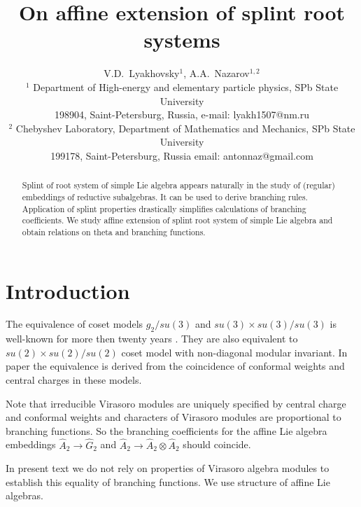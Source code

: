 \documentclass[12pt]{article}
\begin{document}
\title{On affine extension of splint root systems}



\author{V.D.~Lyakhovsky$^1$, A.A.~Nazarov$^{1,2}$ \\
  {\small $^1$ Department of High-energy and elementary particle physics, SPb State University}\\
  {\small 198904, Saint-Petersburg, Russia,}
  {\small e-mail: lyakh1507@nm.ru}\\
  {\small$^{2}$ Chebyshev Laboratory,}
  {\small Department of Mathematics and Mechanics, SPb State University}\\
  {\small 199178, Saint-Petersburg, Russia}
  {\small email: antonnaz@gmail.com}}
\date{}
\maketitle

\begin{abstract}
Splint of root system of simple Lie algebra appears naturally in
the study of (regular) embeddings of reductive subalgebras. It can
be used to derive branching rules. Application of
splint properties drastically simplifies calculations of
branching coefficients. We study affine extension of splint root system of simple Lie algebra and obtain relations on theta and branching functions.
\end{abstract}

\section{Introduction}
\label{sec:introduction}

The equivalence of coset models $g_2/su(3)$ and $su(3)\times
su(3)/su(3)$ is well-known for more then twenty years \cite{Dunbar:1992gh}. 
They are also equivalent to $su(2)\times su(2)/su(2)$ coset model with
non-diagonal modular invariant. In paper \cite{Dunbar:1992gh} the equivalence
is derived from the coincidence of conformal weights and central
charges in these models.

Note that irreducible Virasoro modules are uniquely specified by central
charge and conformal weights and characters
of Virasoro modules are proportional to branching functions. So the branching
coefficients for the affine Lie algebra embeddings $\hat A_2\to \hat G_2$ and
$\hat A_2\to \hat A_2 \otimes \hat A_2$ should coincide.

In present text we do not rely on properties of Virasoro algebra modules to
establish this equality of branching functions. We use structure of affine Lie
algebras.
\end{document}
